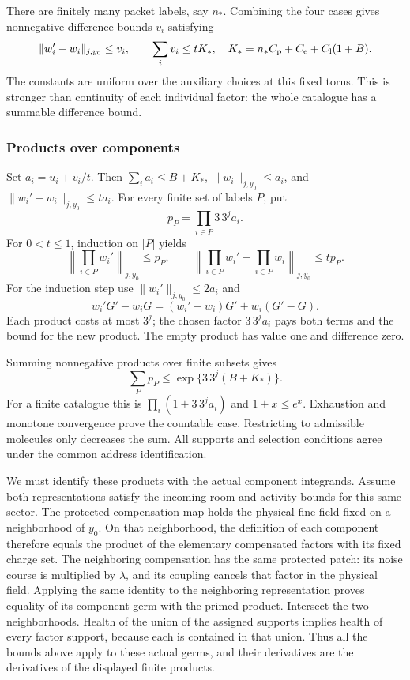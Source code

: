 There are finitely many packet labels, say $n_*$. Combining the four
cases gives nonnegative difference bounds $v_i$ satisfying
\begin{equation}\label{eq:local-parameter-elementary-differences}
 \|w_i'-w_i\|_{j,y_0}\le v_i,\qquad
 \sum_i v_i\le tK_*,\quad
 K_*=n_*C_{\rm p}+C_{\rm e}+C_{\rm l}(1+B).
\end{equation}
The constants are uniform over the auxiliary choices at this fixed
torus. This is stronger than continuity of each individual factor:
the whole catalogue has a summable difference bound.

\subsubsection{Products over components}
Set $a_i=u_i+v_i/t$. Then $\sum_i a_i\le B+K_*$,
$\|w_i\|_{j,y_0}\le a_i$, and
$\|w_i'-w_i\|_{j,y_0}\le t a_i$. For every finite set of labels $P$,
put
\[
                    p_P=\prod_{i\in P}3\,3^j a_i.
\]
For $0<t\le1$, induction on $|P|$ yields
\begin{equation}\label{eq:local-parameter-component-products}
 \left\|\prod_{i\in P}w_i'\right\|_{j,y_0}\le p_P,
 \qquad
 \left\|\prod_{i\in P}w_i'-\prod_{i\in P}w_i\right\|_{j,y_0}
                                                     \le t p_P.
\end{equation}
For the induction step use $\|w_i'\|_{j,y_0}\le2a_i$ and
\[
 w_i'G'-w_iG=(w_i'-w_i)G'+w_i(G'-G).
\]
Each product costs at most $3^j$; the chosen factor $3\,3^j a_i$
pays both terms and the bound for the new product. The empty product
has value one and difference zero.

Summing nonnegative products over finite subsets gives
\begin{equation}\label{eq:local-parameter-product-sum}
                 \sum_P p_P\le
                      \exp\{3\,3^j(B+K_*)\}.
\end{equation}
For a finite catalogue this is $\prod_i(1+3\,3^j a_i)$ and
$1+x\le e^x$. Exhaustion and monotone convergence prove the countable
case. Restricting to admissible molecules only decreases the sum.
All supports and selection conditions agree under the common address
identification.

We must identify these products with the actual component integrands.
Assume both representations satisfy the incoming room and activity
bounds for this same sector. The protected compensation map holds
the physical fine field fixed on a neighborhood of $y_0$. On that
neighborhood, the definition of each component therefore equals the
product of the elementary compensated factors with its fixed charge
set. The neighboring compensation has the same protected patch:
its noise course is multiplied by $\lambda$, and its coupling
cancels that factor in the physical field. Applying the same identity
to the neighboring representation proves equality of its component
germ with the primed product. Intersect the two neighborhoods.
Health of the union of the assigned supports implies health of every
factor support, because each is contained in that union. Thus all
the bounds above apply to these actual germs, and their derivatives
are the derivatives of the displayed finite products.

